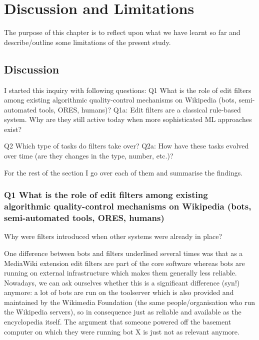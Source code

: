 \chapter{Discussion and Limitations}
\label{chap:discussion}

The purpose of this chapter is to reflect upon what we have learnt so far and describe/outline some limitations of the present study.

\section{Discussion}

I started this inquiry with following questions: %
Q1 What is the role of edit filters among existing algorithmic quality-control mechanisms on Wikipedia (bots, semi-automated tools, ORES, humans)?
Q1a: Edit filters are a classical rule-based system. Why are they still active today when more sophisticated ML approaches exist?

Q2 Which type of tasks do filters take over? %
Q2a: How have these tasks evolved over time (are they changes in the type, number, etc.)? %

For the rest of the section I go over each of them and summarise the findings.

\subsection{Q1 What is the role of edit filters among existing algorithmic quality-control mechanisms on Wikipedia (bots, semi-automated tools, ORES, humans)}

Why were filters introduced when other systems were already in place?

One difference between bots and filters underlined several times was that as a MediaWiki extension edit filters are part of the core software whereas bots are running on external infrastructure which makes them generally less reliable.
Nowadays, we can ask ourselves whether this is a significant difference (syn!) anymore:
a lot of bots are run on the toolserver which is also provided and maintained by the Wikimedia Foundation (the same people/organisation who run the Wikipedia servers), so in consequence just as reliable and available as the encyclopedia itself.
The argument that someone powered off the basement computer on which they were running bot X is just not as relevant anymore.

